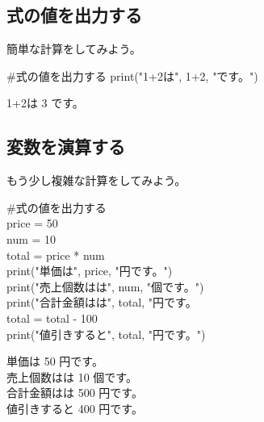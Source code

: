 \documentclass[11pt,a4paper]{jreport}
\begin{document}
\subsection{式の値を出力する}
簡単な計算をしてみよう。
\begin{shadebox}
 \#式の値を出力する
 print("1+2は", 1+2, "です。")
\end{shadebox}
\vspace{0.2in}
\begin{screen}
 1+2は 3 です。
\end{screen}
\vspace{0.2in}

\subsection{変数を演算する}
もう少し複雑な計算をしてみよう。

\begin{shadebox}
 \#式の値を出力する\\
 price = 50\\
 num = 10\\
 total = price * num\\
 print("単価は", price, "円です。")\\
 print("売上個数はは", num, "個です。")\\
 print("合計金額はは", total, "円です。\\
 total = total - 100\\
 print("値引きすると", total, "円です。")
\end{shadebox}
\vspace{0.2in}
\begin{screen}
 単価は 50 円です。\\
 売上個数はは 10 個です。\\
 合計金額はは 500 円です。\\
 値引きすると 400 円です。
\end{screen}
\vspace{0.2in}
\end{document}

